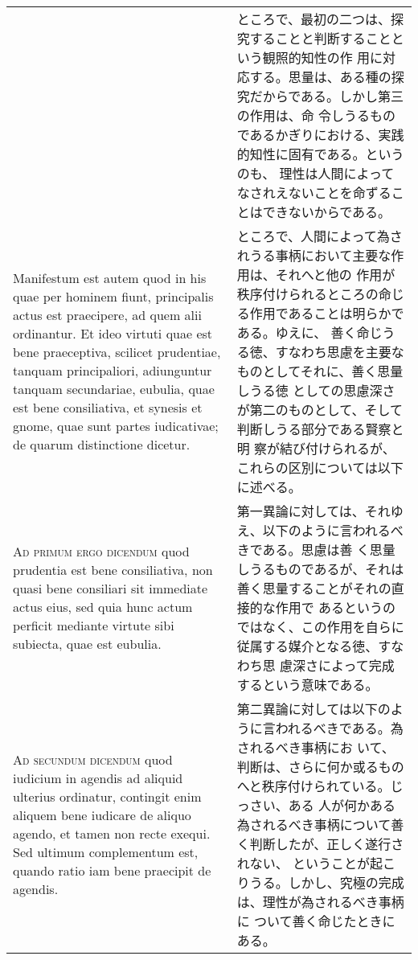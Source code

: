\documentclass[10pt]{jsarticle}
\begin{document}
\begin{longtable}{p{21em}p{21em}}
&

ところで、最初の二つは、探究することと判断することという観照的知性の作
用に対応する。思量は、ある種の探究だからである。しかし第三の作用は、命
令しうるものであるかぎりにおける、実践的知性に固有である。というのも、
理性は人間によってなされえないことを命ずることはできないからである。

\\

Manifestum est autem quod in his quae per hominem fiunt, principalis
actus est praecipere, ad quem alii ordinantur. Et ideo virtuti quae
est bene praeceptiva, scilicet prudentiae, tanquam principaliori,
adiunguntur tanquam secundariae, eubulia, quae est bene consiliativa,
et synesis et gnome, quae sunt partes iudicativae; de quarum
distinctione dicetur.

&

ところで、人間によって為されうる事柄において主要な作用は、それへと他の
作用が秩序付けられるところの命じる作用であることは明らかである。ゆえに、
善く命じうる徳、すなわち思慮を主要なものとしてそれに、善く思量しうる徳
としての思慮深さが第二のものとして、そして判断しうる部分である賢察と明
察が結び付けられるが、これらの区別については以下に述べる。
\\

{\scshape Ad primum ergo dicendum} quod prudentia est bene
consiliativa, non quasi bene consiliari sit immediate actus eius, sed
quia hunc actum perficit mediante virtute sibi subiecta, quae est
eubulia.

&

第一異論に対しては、それゆえ、以下のように言われるべきである。思慮は善
く思量しうるものであるが、それは善く思量することがそれの直接的な作用で
あるというのではなく、この作用を自らに従属する媒介となる徳、すなわち思
慮深さによって完成するという意味である。

\\

{\scshape Ad secundum dicendum} quod iudicium in agendis ad aliquid
ulterius ordinatur, contingit enim aliquem bene iudicare de aliquo
agendo, et tamen non recte exequi. Sed ultimum complementum est,
quando ratio iam bene praecipit de agendis.

&

第二異論に対しては以下のように言われるべきである。為されるべき事柄にお
いて、判断は、さらに何か或るものへと秩序付けられている。じっさい、ある
人が何かある為されるべき事柄について善く判断したが、正しく遂行されない、
ということが起こりうる。しかし、究極の完成は、理性が為されるべき事柄に
ついて善く命じたときにある。


\end{longtable}
\end{document}
